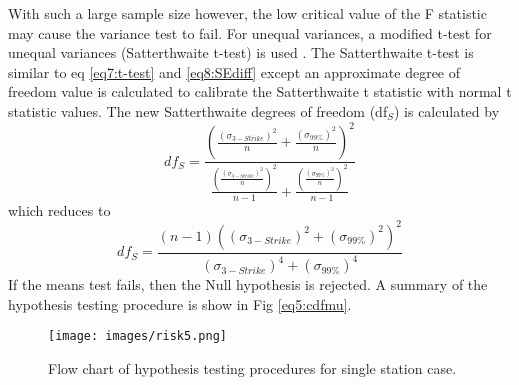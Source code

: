 With such a large sample size however, the low critical value of the F statistic may cause the variance test to fail. For unequal variances, a modified t-test for unequal variances (Satterthwaite t-test) is used \citep{Ruxton2006}.  The Satterthwaite t-test is similar to eq \ref{eq7:t-test} and \ref{eq8:SEdiff} except an approximate degree of freedom value is calculated to calibrate the Satterthwaite t statistic with normal t statistic values. The new Satterthwaite degrees of freedom (df$_{S}$) is calculated by
%
\begin{equation}
\label{eq9:sath_dfs}
df_{S} = \frac{\left(\frac{(\sigma_{3-Strike})^{2}}{n}+\frac{(\sigma_{99\%})^{2}}{n}\right)^{2}}{ \frac{\left(\frac{(\sigma_{3-Strike})^{2}}{n}\right )^{2}}{n-1}+\frac{\left(\frac{(\sigma_{99\%})^{2}}{n}\right )^{2}}{n-1}}
\end{equation}
%
\noindent
which reduces to
%
\begin{equation}
\label{eq10:sath_dfs_reduce}
df_{S} = \frac{(n-1)\left ((\sigma_{3-Strike})^{2}+(\sigma_{99\%})^{2}\right )^{2}}{(\sigma_{3-Strike})^{4}+(\sigma_{99\%})^{4}}
\end{equation}
%
If the means test fails, then the Null hypothesis is rejected.  A summary of the hypothesis testing procedure is show in Fig \ref{eq5:cdfmu}.
%  
\begin{figure}
\texttt{[image: images/risk5.png]} 
\caption{Flow chart of hypothesis testing procedures for single station case.}
\label{fig5:flowchart}
\end{figure}
%
